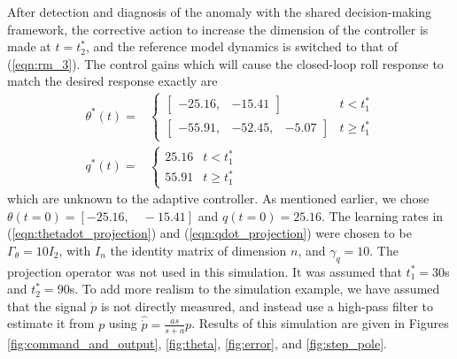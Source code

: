 After detection and diagnosis of the anomaly with the shared decision-making framework, the corrective action to increase the dimension of the controller is made at $t = t_2^*$, and the reference model dynamics is switched to that of (\ref{eqn:rm_3}).
%
The control gains which will cause the closed-loop roll response to match the desired response exactly are
\begin{align}
	\theta^*(t) = & \begin{cases}
		\begin{bmatrix}
			-25.16, & -15.41
		\end{bmatrix}  & t < t_1^* \\
		\begin{bmatrix}
			-55.91, & -52.45, & -5.07
		\end{bmatrix} & t \geq t_1^*
	\end{cases} \\
	q^*(t) = & \begin{cases}
		25.16 & t < t_1^* \\
		55.91 & t \geq t_1^*
	\end{cases}
\end{align}
\noindent which are unknown to the adaptive controller. As mentioned earlier, we chose $\theta(t=0)= [-25.16, \quad -15.41]$ and $q(t=0)=25.16$. The learning rates in (\ref{eqn:thetadot_projection}) and (\ref{eqn:qdot_projection}) were chosen to be $\Gamma_\theta = 10 I_2$, with $I_n$ the identity matrix of dimension $n$, and $\gamma_q = 10$. The projection operator was not used in this simulation. It was assumed that $t_1^*=30$s and $t_2^*=90$s. To add more realism to the simulation example, we have assumed that the signal $\dot{p}$ is not directly measured, and instead use a high-pass filter to estimate it from $p$ using $\hat{\dot{p}} = \frac{as}{s+a} p$. Results of this simulation are given in Figures \ref{fig:command_and_output}, \ref{fig:theta}, \ref{fig:error}, and \ref{fig:step_pole}. 

